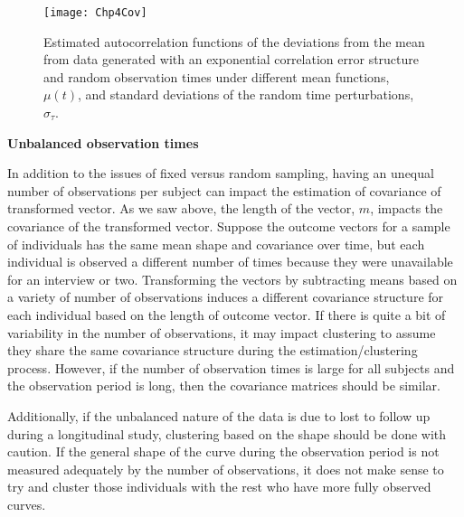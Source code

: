 \documentclass[12pt]{article}
\begin{document}
\begin{landscape}
\begin{figure}
\centering
\texttt{[image: Chp4Cov]}
\caption{Estimated autocorrelation functions of the deviations from the mean from data generated with an exponential correlation error structure and random observation times under different mean functions, $\mu(t)$, and standard deviations of the random time perturbations, $\sigma_{\tau}$.}
\label{fig:cov}
\end{figure}
\end{landscape}

\noindent \textbf{Unbalanced observation times}

In addition to the issues of fixed versus random sampling, having an unequal number of observations per subject can impact the estimation of covariance of transformed vector. As we saw above, the length of the vector, $m$, impacts the covariance of the transformed vector. Suppose the outcome vectors for a sample of individuals has the same mean shape and covariance over time, but each individual is observed a different number of times because they were unavailable for an interview or two. Transforming the vectors by subtracting means based on a variety of number of observations induces a different covariance structure for each individual based on the length of outcome vector. If there is quite a bit of variability in the number of observations, it may impact clustering to assume they share the same covariance structure during the estimation/clustering process. However, if the number of observation times is large for all subjects and the observation period is long, then the covariance matrices should be similar. 

Additionally, if the unbalanced nature of the data is due to lost to follow up during a longitudinal study, clustering based on the shape should be done with caution. If the general shape of the curve during the observation period is not measured adequately by the number of observations, it does not make sense to try and cluster those individuals with the rest who have more fully observed curves. 
\end{document}
